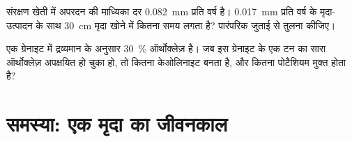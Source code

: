 \begin{exercise}[$\star\star\star$]\label{exo:g10:soil-formation:14}
संरक्षण खेती में अपरदन की माध्यिका दर \qty{0.082}{mm} प्रति
वर्ष है। \qty{0.017}{mm} प्रति वर्ष के मृदा-उत्पादन के साथ \qty{30}{cm} मृदा
खोने में कितना समय लगता है? पारंपरिक जुताई से तुलना कीजिए।
\end{exercise}

\begin{exercise}[$\star\star\star$]\label{exo:g10:soil-formation:15}
एक ग्रेनाइट में द्रव्यमान के अनुसार \qty{30}{\percent} ऑर्थोक्लेज़ है। जब इस ग्रेनाइट
के एक टन का सारा ऑर्थोक्लेज़ अपक्षयित हो चुका हो, तो कितना केओलिनाइट बनता है,
और कितना पोटैशियम मुक्त होता है?
\end{exercise}

\section{समस्या: एक मृदा का जीवनकाल}

